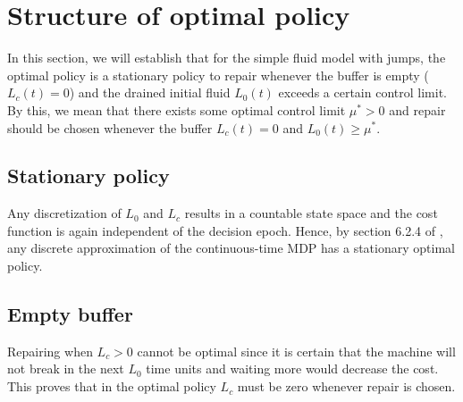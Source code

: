 \section{Structure of optimal policy}
In this section, we will establish that for the simple fluid model with jumps, the optimal policy is a stationary policy to repair whenever the buffer is empty ($L_c(t)=0$) and the drained initial fluid $L_0(t)$ exceeds a certain control limit.
By this, we mean that there exists some optimal control limit $\mu^*>0$ and repair should be chosen whenever the buffer $L_c(t)=0$ and $L_0(t)\geq\mu^*$.

\subsection{Stationary policy}
Any discretization of $L_0$ and $L_c$ results in a countable state space and the cost function is again independent of the decision epoch.
Hence, by section 6.2.4 of \cite{Puterman2008}, any discrete approximation of the continuous-time MDP has a stationary optimal policy.

\subsection{Empty buffer}
Repairing when $L_c>0$ cannot be optimal since it is certain that the machine will not break in the next $L_0$ time units and waiting more would decrease the cost.
This proves that in the optimal policy $L_c$ must be zero whenever repair is chosen.

